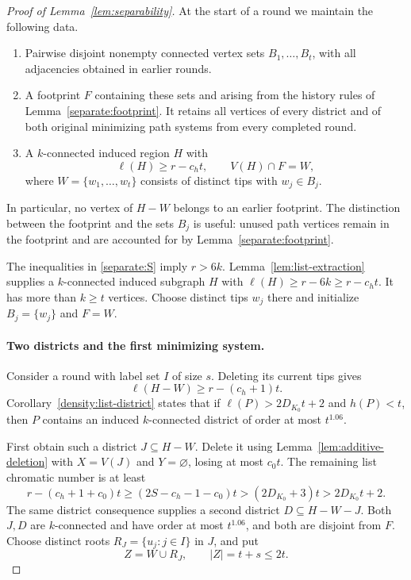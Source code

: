 \begin{proof}[Proof of Lemma~\ref{lem:separability}]
At the start of a round we maintain the following data.
\begin{enumerate}[label=\textup{(\arabic*)}]
\item Pairwise disjoint nonempty connected vertex sets
\(B_1,\ldots,B_t\), with all adjacencies obtained in earlier rounds.
\item A footprint \(F\) containing these sets and arising from the
history rules of Lemma~\ref{separate:footprint}. It retains all
vertices of every district and of both original minimizing path
systems from every completed round.
\item A \(k\)-connected induced region \(H\) with
\[
 \ell(H)\ge r-c_ht,\qquad V(H)\cap F=W,
\]
where \(W=\{w_1,\ldots,w_t\}\) consists of distinct tips with
\(w_j\in B_j\).
\end{enumerate}
In particular, no vertex of \(H-W\) belongs to an earlier footprint.
The distinction between the footprint and the sets \(B_j\) is
useful: unused path vertices remain in the footprint and are
accounted for by Lemma~\ref{separate:footprint}.

The inequalities in \eqref{separate:S} imply \(r>6k\).
Lemma~\ref{lem:list-extraction} supplies a \(k\)-connected induced
subgraph \(H\) with
\(\ell(H)\ge r-6k\ge r-c_ht\).
It has more than \(k\ge t\) vertices. Choose distinct tips \(w_j\)
there and initialize \(B_j=\{w_j\}\) and \(F=W\).

\paragraph{Two districts and the first minimizing system.}
Consider a round with label set \(I\) of size \(s\). Deleting its
current tips gives
\[
 \ell(H-W)\ge r-(c_h+1)t.
\]
Corollary~\ref{density:list-district} states that
if \(\ell(P)>2D_{K_0}t+2\) and \(h(P)<t\), then \(P\) contains
an induced \(k\)-connected district of order at most \(t^{1.06}\).

First obtain such a district \(J\subseteq H-W\). Delete it using
Lemma~\ref{lem:additive-deletion} with \(X=V(J)\) and
\(Y=\varnothing\), losing at most \(c_0t\).
The remaining list chromatic number is at least
\[
 r-(c_h+1+c_0)t
 \ge(2S-c_h-1-c_0)t
 >(2D_{K_0}+3)t>2D_{K_0}t+2.
\]
The same district consequence supplies a second district
\(D\subseteq H-W-J\). Both \(J,D\) are \(k\)-connected and have
order at most \(t^{1.06}\), and both are disjoint from \(F\).
Choose distinct roots \(R_J=\{u_j:j\in I\}\) in \(J\), and put
\[
 Z=W\cup R_J,\qquad |Z|=t+s\le2t.
\]


\end{proof}
